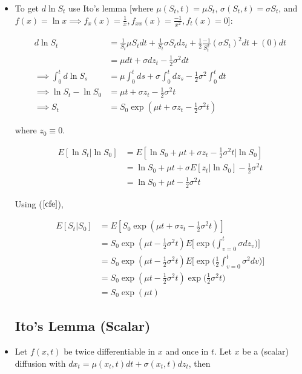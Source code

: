 \documentclass{article}
\begin{document}
\begin{itemize}
\item To get $d \ln S_t$ use Ito's lemma [where $\mu(S_t, t) = \mu S_t$, $\sigma(S_t, t) = \sigma S_t$, and $f(x) = \ln x \implies f_x(x) = \frac{1}{x}, f_{xx}(x) = \frac{-1}{x^2}, f_t(x) = 0$]:

\begin{align*}
d \ln S_t 
&= \frac{1}{S_t} \mu S_t dt  + \frac{1}{S_t} \sigma S_t dz_t + \frac{1}{2} \frac{-1}{S_t^2} (\sigma S_t)^2 dt + (0) dt \\
&= \mu dt + \sigma dz_t - \frac{1}{2} \sigma^2 dt \\
\implies 
\int_0^t d \ln S_s
&= \mu \int_0^t  ds + \sigma \int_0^t dz_s - \frac{1}{2} \sigma^2  \int_0^t dt \\
\implies 
\ln S_t - \ln S_0
&= \mu t + \sigma z_t - \frac{1}{2} \sigma^2 t \\
\implies
S_t &= S_0 \exp (\mu t + \sigma z_t - \frac{1}{2} \sigma^2 t)
\end{align*}

where $z_0 \equiv 0$.

\begin{align*}
E[\ln S_t | \ln S_0 ] 
&= E[\ln S_0 + \mu t + \sigma z_t - \frac{1}{2} \sigma^2 t | \ln S_0 ] \\
&= \ln S_0 + \mu t + \sigma E[z_t|\ln S_0] - \frac{1}{2} \sigma^2 t \\
&=  \ln S_0 + \mu t - \frac{1}{2} \sigma^2 t
\end{align*}

Using ($\ref{cfe}$),

\begin{align*}
E[S_t | S_0] 
&= E[S_0 \exp (\mu t + \sigma z_t - \frac{1}{2} \sigma^2 t)]\\
&= S_0 \exp (\mu t- \frac{1}{2} \sigma^2 t) E\Bigg[\exp\Bigg( \int_{v=0}^t \sigma dz_v\Bigg)\Bigg]\\
&= S_0 \exp (\mu t- \frac{1}{2} \sigma^2 t) E\Bigg[\exp\Bigg(\frac{1}{2} \int_{v=0}^t \sigma^2 dv\Bigg)\Bigg]\\
&= S_0 \exp (\mu t- \frac{1}{2} \sigma^2 t) \exp\Bigg(\frac{1}{2} \sigma^2t \Bigg)\\
&= S_0 \exp (\mu t)
\end{align*}

\subsection*{Ito's Lemma (Scalar)}

\item Let $f(x, t)$ be twice differentiable in $x$ and once in $t$. Let $x$ be a (scalar) diffusion with $dx_t = \mu (x_t, t) dt + \sigma(x_t, t) dz_t$, then


\end{itemize}
\end{document}
